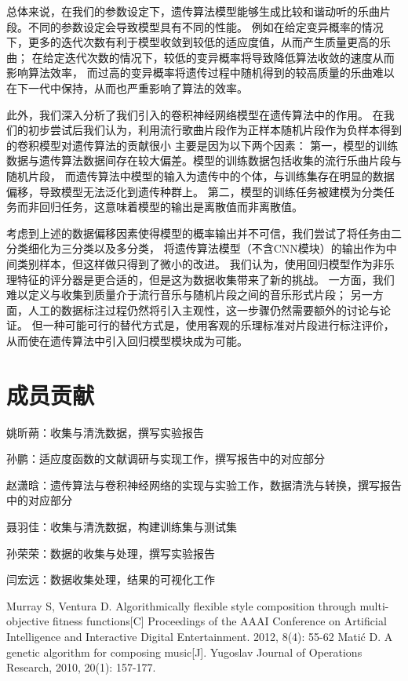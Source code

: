 \documentclass{article}
\begin{document}
总体来说，在我们的参数设定下，遗传算法模型能够生成比较和谐动听的乐曲片段。不同的参数设定会导致模型具有不同的性能。
例如在给定变异概率的情况下，更多的迭代次数有利于模型收敛到较低的适应度值，从而产生质量更高的乐曲；
在给定迭代次数的情况下，较低的变异概率将导致降低算法收敛的速度从而影响算法效率，
而过高的变异概率将遗传过程中随机得到的较高质量的乐曲难以在下一代中保持，从而也严重影响了算法的效率。

此外，我们深入分析了我们引入的卷积神经网络模型在遗传算法中的作用。
在我们的初步尝试后我们认为，利用流行歌曲片段作为正样本随机片段作为负样本得到的卷积模型对遗传算法的贡献很小
主要是因为以下两个因素：
第一，模型的训练数据与遗传算法数据间存在较大偏差。模型的训练数据包括收集的流行乐曲片段与随机片段，
而遗传算法中模型的输入为遗传中的个体，与训练集存在明显的数据偏移，导致模型无法泛化到遗传种群上。
第二，模型的训练任务被建模为分类任务而非回归任务，这意味着模型的输出是离散值而非离散值。

考虑到上述的数据偏移因素使得模型的概率输出并不可信，我们尝试了将任务由二分类细化为三分类以及多分类，
将遗传算法模型（不含CNN模块）的输出作为中间类别样本，但这样做只得到了微小的改进。
我们认为，使用回归模型作为非乐理特征的评分器是更合适的，但是这为数据收集带来了新的挑战。
一方面，我们难以定义与收集到质量介于流行音乐与随机片段之间的音乐形式片段；
另一方面，人工的数据标注过程仍然将引入主观性，这一步骤仍然需要额外的讨论与论证。
但一种可能可行的替代方式是，使用客观的乐理标准对片段进行标注评价，从而使在遗传算法中引入回归模型模块成为可能。

\section{成员贡献}
姚昕蒴：收集与清洗数据，撰写实验报告

孙鹏：适应度函数的文献调研与实现工作，撰写报告中的对应部分

赵潇晗：遗传算法与卷积神经网络的实现与实验工作，数据清洗与转换，撰写报告中的对应部分

聂羽佳：收集与清洗数据，构建训练集与测试集

孙荣荣：数据的收集与处理，撰写实验报告

闫宏远：数据收集处理，结果的可视化工作


\begin{thebibliography}{2}
    Murray S, Ventura D. Algorithmically flexible style composition through multi-objective fitness functions[C] Proceedings of the AAAI Conference on Artificial Intelligence and Interactive Digital Entertainment. 2012, 8(4): 55-62
    Matić D. A genetic algorithm for composing music[J]. Yugoslav Journal of Operations Research, 2010, 20(1): 157-177.
\end{thebibliography}
\end{document}
